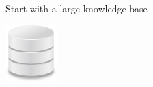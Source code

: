 %
%


\begin{frame}{Start with a large knowledge base}
\begin{center}
  \hspace{0.8cm}
  \includegraphics[height=2.2cm]{../img/database.png}
\end{center}
\end{frame}

